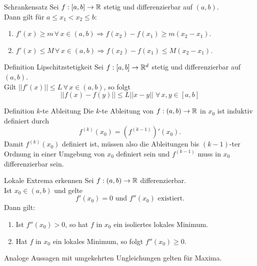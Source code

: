 \documentclass[main.tex]{subfiles}
\begin{document}
\begin{karte}{Schrankensatz}
    Sei \( f: [a,b] \rightarrow \mathbb{R} \) stetig und differenzierbar 
    auf \( (a,b) \).\\
    Dann gilt für \( a \leq x_1 < x_2 \leq b \): 
    \begin{enumerate}
        \item \( f'(x) \geq m \,\forall \, x \in (a,b) 
        \Rightarrow f(x_2) - f(x_1) \geq m(x_2 - x_1) \).
        \item \( f'(x) \leq M \, \forall \, x\in (a,b) 
        \Rightarrow f(x_2) - f(x_1) \leq M(x_2 - x_1) \).
    \end{enumerate}
\end{karte}
\begin{karte}{Definition Lipschitzstetigkeit}
    Sei \( f: [a,b] \rightarrow \mathbb{R}^d \) stetig und 
    differenzierbar auf \( (a,b) \). \\
    Gilt \( ||f'(x)|| \leq L \, \forall \, x \in (a,b) \), 
    so folgt 
    \[ ||f(x) - f(y)|| \leq L ||x-y|| 
    \; \forall \, x,y \in [a,b] \]
\end{karte}
\begin{karte}{Definition \(k\)-te Ableitung}
    Die \( k \)-te Ableitung von 
    \( f: (a,b) \rightarrow \mathbb{R} \) in \( x_0 \) ist 
    induktiv definiert durch 
    \[ f^{(k)}(x_0) = (f^{(k-1)})'(x_0). \]
    Damit \( f^{(k)}(x_0) \) definiert ist, müssen 
    also die Ableitungen bis \( (k-1) \)-ter Ordnung 
    in einer Umgebung von \( x_0 \) definiert sein und 
    \( f^{(k-1)} \) muss in \( x_0 \) differenzierbar sein.
\end{karte}
\begin{karte}{Lokale Extrema erkennen}
    Sei \( f: (a,b) \rightarrow \mathbb{R} \) differenzierbar. \\
    Ist \( x_0 \in (a,b) \) und gelte 
    \[ f'(x_0) = 0 \text{ und } f''(x_0) \text{ existiert.} \]
    Dann gilt:
    \begin{enumerate}
        \item Ist \( f''(x_0) > 0 \), so hat \( f \) in 
        \( x_0 \) ein isoliertes lokales Minimum.
        \item Hat \( f \) in \( x_0 \) ein lokales 
        Minimum, so folgt \( f''(x_0) \geq 0 \).
    \end{enumerate}
    Analoge Aussagen mit umgekehrten Ungleichungen gelten 
    für Maxima.
\end{karte}
\end{document}
